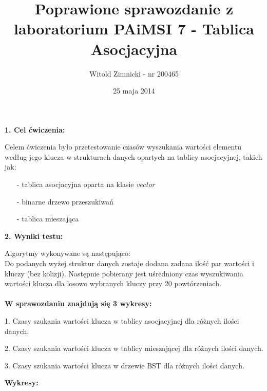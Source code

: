 \documentclass[12pt,a4paper,titlepage]{article}
\title{Poprawione sprawozdanie z laboratorium PAiMSI 7 -
Tablica Asocjacyjna}
\date{25 maja 2014}
\author{Witold Zimnicki - nr 200465}
\begin{document}
	\maketitle
	\pagestyle{empty}
	\pagestyle{headings}
	\begin{large}
	\textbf{1. Cel ćwiczenia:}
	\newline
	\end{large}

	Celem ćwiczenia było przetestowanie czasów wyszukania wartości elementu według jego klucza w strukturach danych opartych na tablicy asocjacyjnej, takich jak:
	\begin{itemize}
\item[-] tablica asocjacyjna oparta na klasie \textit{vector}
\item[-] binarne drzewo przeszukiwań
\item[-] tablica mieszająca
\newline
\newline


	\end{itemize}
	
	
	\begin{large}
	\textbf{2. Wyniki testu:}
	\newline
	\end{large}
	
	Algorytmy wykonywane są następująco: \\
	Do podanych wyżej struktur danych zostaje dodana zadana ilość par wartości i kluczy (bez kolizji). Następnie pobierany jest uśredniony czas wyszukiwania wartości klucza dla losowo wybranych kluczy przy 20 powtórzeniach.\\
	\\
	
	
	\textbf{W sprawozdaniu znajdują się 3 wykresy:}\newline
	
1. Czasy szukania wartości klucza w tablicy asocjacyjnej dla różnych ilości danych. \newline
	 
2. Czasy szukania wartości klucza w tablicy mieszającej dla różnych ilości danych. \newline
	
3. Czasy szukania wartości klucza w drzewie BST dla różnych ilości danych. \newline
	
	\newpage
	
	\begin{large}
	\textbf{Wykresy:}
	\newline
	\end{large}
	
\end{document}
